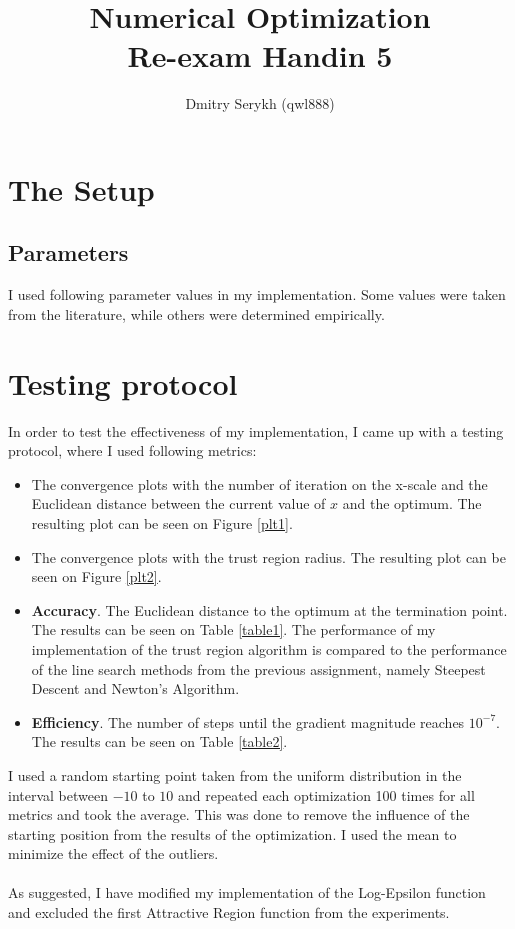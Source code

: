 \documentclass[a4paper]{article}
\title{\vspace{-5cm} Numerical Optimization \\ Re-exam Handin 5}
\author{Dmitry Serykh (qwl888)}
\begin{document}
\maketitle
\section{The Setup}

\subsection{Parameters}
I used following parameter values in my implementation. Some values were taken
from the literature, while others were determined empirically.

\section{Testing protocol}
In order to test the effectiveness of my implementation, I came up with a
testing protocol, where I used following metrics:
\begin{itemize}
\item The convergence plots with the number of iteration on the x-scale and the
  Euclidean distance between the current value of $x$ and the
  optimum. The resulting plot can be seen on Figure \ref{plt1}.
\item The convergence plots with the trust region radius.
  The resulting plot can be seen on Figure \ref{plt2}. 
\item \textbf{Accuracy}. The Euclidean distance to the optimum at the
  termination point. The results can be seen on Table \ref{table1}.
  The performance of my implementation of the trust
  region algorithm is compared to the performance of the line search methods
  from the previous assignment, namely Steepest Descent and Newton's Algorithm.
\item \textbf{Efficiency}. The number of steps until the gradient
  magnitude reaches $10^{-7}$. The results can be seen on Table \ref{table2}.
\end{itemize}
I used a random starting point taken from the uniform distribution in the
interval between $-10$ to $10$ and repeated each optimization 100 times for all
metrics and took the average. This was done to remove the influence of the
starting position from the results of the optimization. I used the mean 
to minimize the effect of the outliers. \\\\
As suggested, I have modified my implementation of the Log-Epsilon function and
excluded the first Attractive Region function from the experiments.
\end{document}
